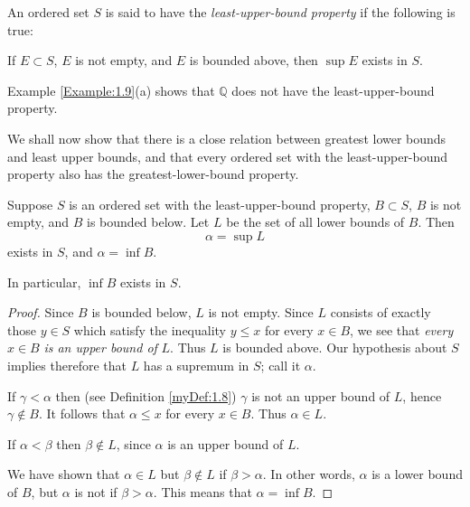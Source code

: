 \begin{myDef}\label{myDef:1.10}
{\color{red}{least-upper-bound property}}

An ordered set $S$ is said to have the \emph{least-upper-bound property}
if the following is true:

If $E \subset S$, $E$ is not empty, and $E$ is bounded above, then $\sup E$ exists in $S$.
\end{myDef}

Example \ref{Example:1.9}(a) shows that $\mathbb{Q}$ does not have the least-upper-bound property.

We shall now show that there is a close relation between greatest lower
bounds and least upper bounds, and that every ordered set with the least-upper-bound property also has the greatest-lower-bound property.

\begin{thm}\label{thm:1.11}
Suppose $S$ is an ordered set with the least-upper-bound property,
$B \subset S$, $B$ is not empty, and $B$ is bounded below. Let $L$ be the set of all lower
bounds of $B$. Then
\begin{equation*}
    \alpha = \sup L
\end{equation*}
exists in $S$, and $\alpha = \inf B$.

In particular, $\inf B$ exists in $S$.
\end{thm}

\begin{proof}
Since $B$ is bounded below, $L$ is not empty. Since $L$ consists of
exactly those $y \in S$ which satisfy the inequality $y \leq x$ for every $x \in B$, we
see that \emph{every} $x \in B$ \emph{is an upper bound of} $L$. Thus $L$ is bounded above.
Our hypothesis about $S$ implies therefore that $L$ has a supremum in $S$;
call it $\alpha$.

If $\gamma <\alpha$ then (see Definition \ref{myDef:1.8}) $\gamma$ is not an upper bound of $L$,
hence $\gamma \not\in B$. It follows that $\alpha \leq x$ for every $x \in B$. Thus $\alpha \in L$.

If $\alpha < \beta$ then $\beta \not\in L$, since $\alpha$ is an upper bound of $L$.

We have shown that $\alpha \in L$ but $\beta \not\in  L$ if $\beta>\alpha$. In other words, $\alpha$
is a lower bound of $B$, but $\alpha$ is not if $\beta > \alpha$. This means that $\alpha = \inf B$.
\end{proof}

